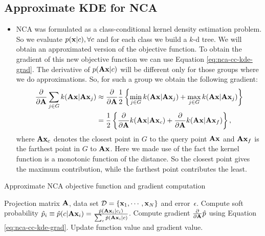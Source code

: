 \subsection{Approximate KDE for NCA}
\label{subsec:approx-KDE-for-NCA}
	\begin{itemize}
		\item NCA was formulated as a class-conditional kernel density estimation problem. So we evaluate $p(\mathbf{x}|c),\forall c$ and for each class we build a $k$-d tree. We will obtain an approximated version of the objective function. To obtain the gradient of this new objective function we can use Equation \ref{eq:nca-cc-kde-grad}. The derivative of $p(\mathbf{A}\mathbf{x}|c)$ will be different only for those groups where we do approximations. So, for such a group we obtain the following gradient:
		\begin{align}
			\frac{\partial}{\partial \mathbf{A}} \sum_{j\in G} k(\mathbf{A}\mathbf{x}|\mathbf{A}\mathbf{x}_j) &\approx \frac{\partial}{\partial \mathbf{A}} \frac{1}{2} \left\{\min_{j\in G} k(\mathbf{A}\mathbf{x}|\mathbf{A}\mathbf{x}_j) + \max_{j\in G} k(\mathbf{A}\mathbf{x}|\mathbf{A}\mathbf{x}_j)\right\}\notag\\
			& = \frac{1}{2}\left\{ \frac{\partial}{\partial \mathbf{A}} k(\mathbf{A}\mathbf{x}|\mathbf{A}\mathbf{x}_c) + \frac{\partial}{\partial \mathbf{A}} k(\mathbf{A}\mathbf{x}|\mathbf{A}\mathbf{x}_f) \right\},
		\end{align}
		where $\mathbf{A}\mathbf{x}_c$ denotes the closest point in $G$ to the query point $\mathbf{A}\mathbf{x}$ and $\mathbf{A}\mathbf{x}_f$ is the farthest point in $G$ to $\mathbf{A}\mathbf{x}$. Here we made use of the fact the kernel function is a monotonic function of the distance. So the closest point gives the maximum contribution, while the farthest point contributes the least.
	\end{itemize}
	
	
	\begin{algorithm} 
		\caption{Approximate NCA objective function and gradient computation} 
		\label{alg:cc-kde-nca}  
		\begin{algorithmic}                    %
			\REQUIRE Projection matrix $\mathbf{A}$, data set $\mathcal{D}=\{\mathbf{x}_1,\cdots,\mathbf{x}_N\}$ and error~$\epsilon$.
			\ENDFOR 
				\ENDFOR
				\STATE Compute soft probability $\hat{p}_i \equiv \hat{p}(c|\mathbf{A}\mathbf{x}_i) = \frac{\hat{p}(\mathbf{A}\mathbf{x}_i|c_i)}{\sum_{c}\hat{p}(\mathbf{A}\mathbf{x}_i|c)}$.
				\STATE Compute gradient $\frac{\partial}{\partial \mathbf{A}} \hat{p}$ using Equation \ref{eq:nca-cc-kde-grad}.
				\STATE Update function value and gradient value.
			\ENDFOR
		\end{algorithmic}
	\end{algorithm}
	
